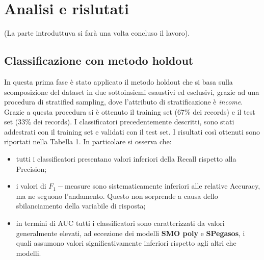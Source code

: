 \documentclass[fleqn,10pt]{SelfArx}
\begin{document}
\section{Analisi e rislutati}
(La parte introduttuva si farà una volta concluso il lavoro).
\subsection{Classificazione con metodo holdout}
In questa prima fase è stato applicato il metodo holdout che si basa sulla scomposizione del dataset in due sottoinsiemi esaustivi ed esclusivi, grazie ad una procedura di stratified sampling, dove l'attributo di stratificazione è \textit{income}. Grazie a questa procedura si è ottenuto il training set (67\% dei records) e il test set (33\% dei records). I classificatori precedentemente descritti, sono stati addestrati con il training set e validati con il test set.
I risultati così ottenuti sono riportati nella Tabella 1.
In particolare si osserva che:
\begin{itemize}
    \item tutti i classificatori presentano valori inferiori della Recall rispetto alla Precision;
    \item i valori di $F_1-$measure sono sistematicamente inferiori alle relative Accuracy, ma ne seguono l'andamento. Questo non sorprende a causa dello sbilanciamento della variabile di risposta;
    \item in termini di AUC tutti i classificatori sono caratterizzati da valori generalmente elevati, ad eccezione dei modelli \textbf{SMO poly} e \textbf{SPegasos}, i quali assumono valori significativamente inferiori rispetto agli altri che modelli.
\end{itemize}
\begin{table}[h!]
\caption{Classificatori con holdout}
\label{table:holdout}
\end{table}
\end{document}
